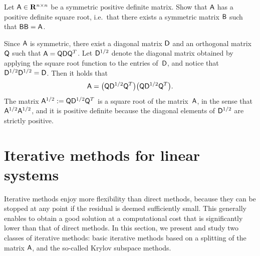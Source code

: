 \begin{exercise}
    \label{exercise:matrix_square_root}
    Let $\mathsf A \in \mathbf R^{n\times n}$ be a symmetric positive definite matrix.
    Show that $\mathsf A$ has a positive definite square root,
    i.e.\ that there exists a symmetric matrix $\mathsf B$ such that $\mathsf B \mathsf B = \mathsf A$.
\end{exercise}
\begin{solution}
    Since $\mathsf A$ is symmetric,
    there exist a diagonal matrix $\mathsf D$ and an orthogonal matrix $\mathsf Q$ such that $\mathsf A = \mathsf Q \mathsf D \mathsf Q^T$.
    Let $\mathsf D^{1/2}$ denote the diagonal matrix obtained by applying the square root function to the entries of~$\mathsf D$,
    and notice that $\mathsf D^{1/2} \mathsf D^{1/2} = \mathsf D$.
    Then it holds that
    \[
        \mathsf A = \bigl(\mathsf Q \mathsf D^{1/2} \mathsf Q^T\bigr) \bigl(\mathsf Q \mathsf D^{1/2} \mathsf Q^T\bigr).
    \]
    The matrix $\mathsf A^{1/2} := \mathsf Q \mathsf D^{1/2} \mathsf Q^T$ is a square root of the matrix~$\mathsf A$,
    in the sense that $\mathsf A^{1/2} \mathsf A^{1/2}$,
    and it is positive definite because the diagonal elements of $\mathsf D^{1/2}$ are strictly positive.
\end{solution}

\section{Iterative methods for linear systems}%
\label{sec:iterative_methods}
Iterative methods enjoy more flexibility than direct methods,
because they can be stopped at any point if the residual is deemed sufficiently small.
This generally enables to obtain a good solution at a computational cost that is significantly lower than that of direct methods.
In this section,
we present and study two classes of iterative methods:
basic iterative methods based on a splitting of the matrix $\mathsf A$,
and the so-called Krylov subspace methods.

